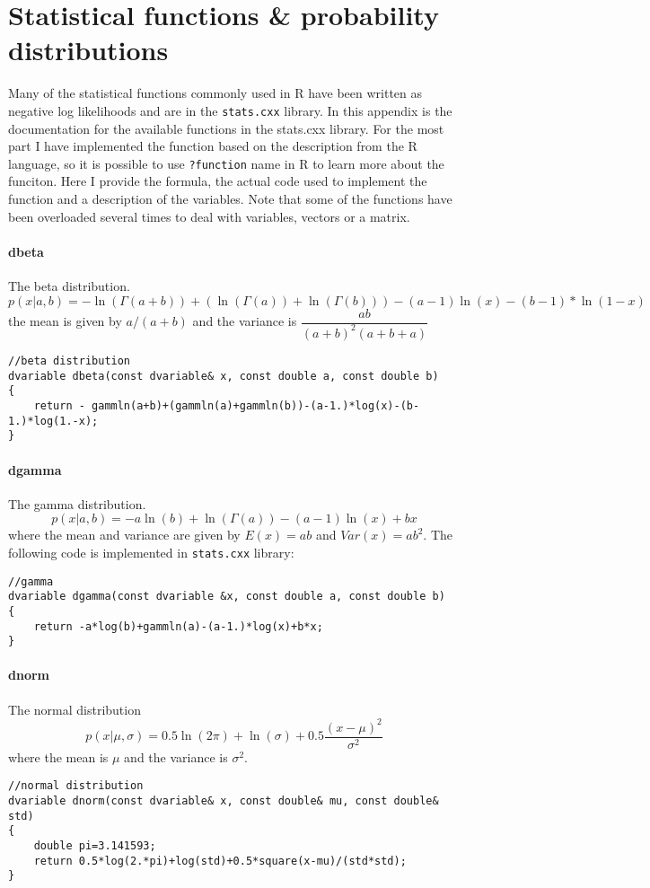 \section{Statistical functions \& probability distributions}
\begin{multicols}{2}
Many of the statistical functions commonly used in R have been written as negative log likelihoods and are in the \texttt{stats.cxx} library.  In this appendix is the documentation for the available functions in the stats.cxx library.  For the most part I have implemented the function based on the description from the R language, so it is possible to use \texttt{?function} name in R to learn more about the funciton.  Here I provide the formula, the actual code used to implement the function and a description of the variables. Note that some of the functions have been overloaded several times to deal with variables, vectors or a matrix.
\end{multicols}

\paragraph{dbeta} The beta distribution.
\[
	p(x|a,b) = - \ln(\Gamma(a+b))+(\ln(\Gamma(a))+\ln(\Gamma(b)))-(a-1)\ln(x)-(b-1)*\ln(1-x)
\]
the mean is given by $a/(a+b)$ and the variance is $\dfrac{ab}{(a+b)^2(a+b+a)}$
\begin{verbatim}
//beta distribution
dvariable dbeta(const dvariable& x, const double a, const double b)
{
	return - gammln(a+b)+(gammln(a)+gammln(b))-(a-1.)*log(x)-(b-1.)*log(1.-x);
}
\end{verbatim}

\paragraph{dgamma} The gamma distribution.
\[
 p(x|a,b) = -a \ln(b)+\ln(\Gamma(a))-(a-1)\ln(x)+bx
\]
where the mean and variance are given by $E(x) = ab$ and $Var(x) = ab^2$. The following code is implemented in \texttt{stats.cxx} library:
\begin{verbatim}
//gamma
dvariable dgamma(const dvariable &x, const double a, const double b)
{
	return -a*log(b)+gammln(a)-(a-1.)*log(x)+b*x;
}
\end{verbatim}


\paragraph{dnorm} The normal distribution
\[
	p(x|\mu,\sigma) = 0.5\ln(2\pi)+\ln(\sigma)+0.5\frac{(x-\mu)^2}{\sigma^2}
\]
where the mean is $\mu$ and the variance is $\sigma^2$.
\begin{verbatim}
//normal distribution
dvariable dnorm(const dvariable& x, const double& mu, const double& std)
{
	double pi=3.141593;
	return 0.5*log(2.*pi)+log(std)+0.5*square(x-mu)/(std*std);
}
\end{verbatim}

